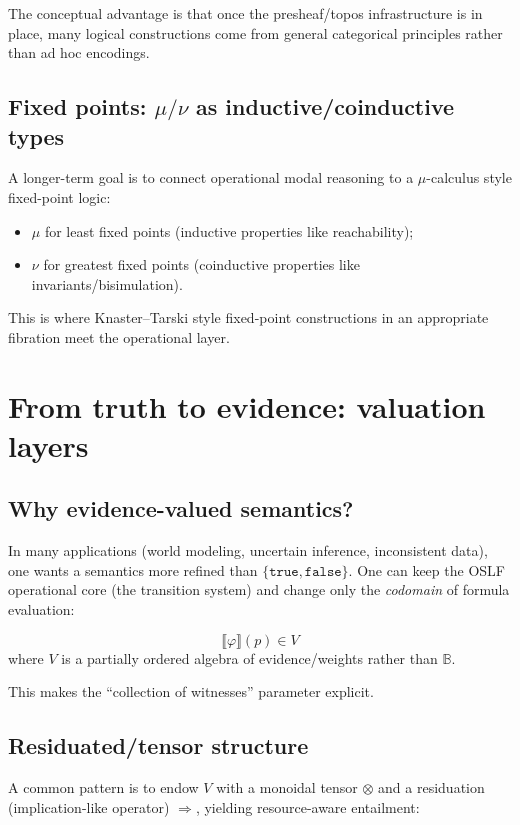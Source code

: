 \documentclass[11pt]{article}
\newcommand{\OSLF}{\textsf{OSLF}}
\newcommand{\BB}{\mathbb{B}}
\begin{document}
The conceptual advantage is that once the presheaf/topos infrastructure is in place,
many logical constructions come from general categorical principles rather than ad hoc encodings.

\subsection{Fixed points: \(\mu/\nu\) as inductive/coinductive types}
A longer-term goal is to connect operational modal reasoning to a \(\mu\)-calculus style
fixed-point logic:

\begin{itemize}
\item \(\mu\) for least fixed points (inductive properties like reachability);
\item \(\nu\) for greatest fixed points (coinductive properties like invariants/bisimulation).
\end{itemize}

This is where Knaster--Tarski style fixed-point constructions in an appropriate fibration
meet the operational layer.

\section{From truth to evidence: valuation layers}

\subsection{Why evidence-valued semantics?}
In many applications (world modeling, uncertain inference, inconsistent data), one wants a semantics
more refined than \(\{\texttt{true},\texttt{false}\}\). One can keep the \OSLF{} operational core (the transition system)
and change only the \emph{codomain} of formula evaluation:

\[
\llbracket \varphi \rrbracket(p) \in V
\]
where \(V\) is a partially ordered algebra of evidence/weights rather than \(\BB\).

This makes the ``collection of witnesses'' parameter explicit.

\subsection{Residuated/tensor structure}
A common pattern is to endow \(V\) with a monoidal tensor \(\otimes\) and a residuation
(implication-like operator) \(\Rightarrow\), yielding resource-aware entailment:
\end{document}
